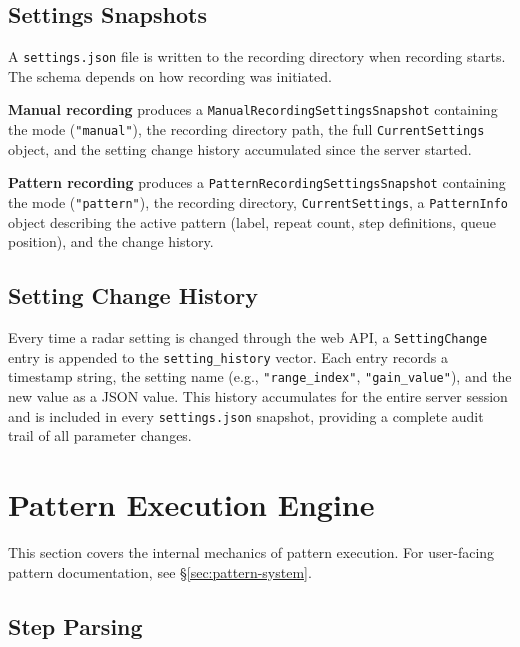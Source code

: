 \documentclass[11pt,letterpaper]{article}
\begin{document}
\subsection{Settings Snapshots}
\label{subsec:recording-snapshots}

A \texttt{settings.json} file is written to the recording directory when recording starts. The schema depends on how recording was initiated.

\textbf{Manual recording} produces a \texttt{ManualRecordingSettingsSnapshot} containing the mode (\texttt{"manual"}), the recording directory path, the full \texttt{CurrentSettings} object, and the setting change history accumulated since the server started.

\textbf{Pattern recording} produces a \texttt{PatternRecordingSettingsSnapshot} containing the mode (\texttt{"pattern"}), the recording directory, \texttt{CurrentSettings}, a \texttt{PatternInfo} object describing the active pattern (label, repeat count, step definitions, queue position), and the change history.

\subsection{Setting Change History}
\label{subsec:recording-history}

Every time a radar setting is changed through the web API, a \texttt{SettingChange} entry is appended to the \texttt{setting\_history} vector. Each entry records a timestamp string, the setting name (e.g., \texttt{"range\_index"}, \texttt{"gain\_value"}), and the new value as a JSON value. This history accumulates for the entire server session and is included in every \texttt{settings.json} snapshot, providing a complete audit trail of all parameter changes.


\newpage
\section{Pattern Execution Engine}
\label{sec:pattern-engine}

This section covers the internal mechanics of pattern execution. For user-facing pattern documentation, see \S\ref{sec:pattern-system}.

\subsection{Step Parsing}
\label{subsec:pattern-parsing}
\end{document}
